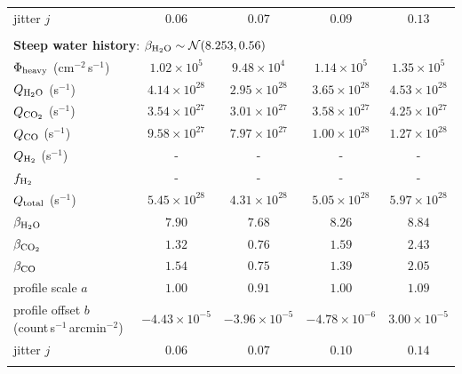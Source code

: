 \begin{table}[!ht]
\begin{tabular}{@{}lcccc@{}}
jitter $j$ & \(0.06\) & \(0.07\) & \(0.09\) & \(0.13\)\\
\addlinespace[3pt]
\multicolumn{5}{@{}l@{}}{\hspace{1.5em}\edit{\(\ln\mathcal L(\hat\theta_{\rm MAP}) = 68.53\qquad \ln Z = 56.4\)}}\\
\midrule
\multicolumn{5}{l}{\textbf{Steep water history}: \(\beta_{\rm H_2O}\sim\mathcal N(8.253,0.56)\)}\\
\midrule
\(\Phi_{\rm heavy}\) (cm\(^{-2}\)\,s\(^{-1}\)) & \(1.02\times10^{5}\) & \(9.48\times10^{4}\) & \(1.14\times10^{5}\) & \(1.35\times10^{5}\)\\
\(Q_{\rm H_2O}\) (s\(^{-1}\)) & \(4.14\times10^{28}\) & \(2.95\times10^{28}\) & \(3.65\times10^{28}\) & \(4.53\times10^{28}\)\\
\(Q_{\rm CO_2}\) (s\(^{-1}\)) & \(3.54\times10^{27}\) & \(3.01\times10^{27}\) & \(3.58\times10^{27}\) & \(4.25\times10^{27}\)\\
\(Q_{\rm CO}\) (s\(^{-1}\)) & \(9.58\times10^{27}\) & \(7.97\times10^{27}\) & \(1.00\times10^{28}\) & \(1.27\times10^{28}\)\\
\(Q_{\rm H_2}\) (s\(^{-1}\)) & - & - & - & -\\
\(f_{\rm H_2}\) & - & - & - & -\\
\(Q_{\rm total}\) (s\(^{-1}\)) & \(5.45\times10^{28}\) & \(4.31\times10^{28}\) & \(5.05\times10^{28}\) & \(5.97\times10^{28}\)\\
\(\beta_{\rm H_2O}\) & \(7.90\) & \(7.68\) & \(8.26\) & \(8.84\)\\
\(\beta_{\rm CO_2}\) & \(1.32\) & \(0.76\) & \(1.59\) & \(2.43\)\\
\(\beta_{\rm CO}\) & \(1.54\) & \(0.75\) & \(1.39\) & \(2.05\)\\
\addlinespace[3pt]
profile scale $a$ & \(1.00\) & \(0.91\) & \(1.00\) & \(1.09\)\\
profile offset $b$ (count\,s\(^{-1}\)\,arcmin\(^{-2}\)) & \(-4.43\times10^{-5}\) & \(-3.96\times10^{-5}\) & \(-4.78\times10^{-6}\) & \(3.00\times10^{-5}\)\\
jitter $j$ & \(0.06\) & \(0.07\) & \(0.10\) & \(0.14\)\\
\addlinespace[3pt]
\multicolumn{5}{@{}l@{}}{\hspace{1.5em}\edit{\(\ln\mathcal L(\hat\theta_{\rm MAP}) = 67.76\qquad \ln Z = 57.3\)}}\\
\bottomrule
\end{tabular}
\label{tab:results-no-h2}
\end{table}
